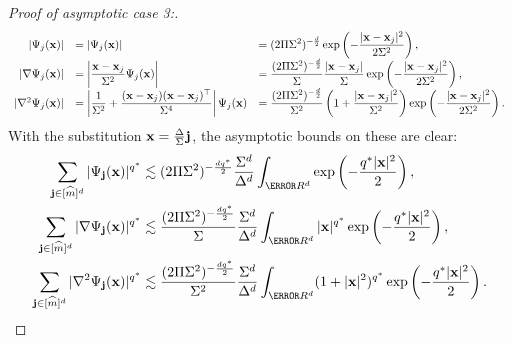 \documentclass[10pt,a4paper,onecolumn]{article} \usepackage[latin1]{inputenc}
\numberwithin{equation}{section}
\renewcommand{\vec}{\mathbf}
\newcommand{\UCmath}[1]{%
	\begingroup
	\ucmathlist\uppercase\expandafter{#1}%
	\endgroup
}
\newcommand{\ucmathlist}{%
	\def\alpha{\mathrm{A}}%
	\def\beta{\mathrm{B}}%
	\let\gamma=\Gamma
	\let\delta=\Delta
	\def\epsilon{\mathrm{E}}%
	\def\varepsilon{\mathrm{E}}%
	\def\zeta{\mathrm{Z}}%
	\def\eta{\mathrm{H}}%
	\let\theta=\Theta
	\let\vartheta=\Theta
	\def\iota{\mathrm{I}}%
	\def\kappa{\mathrm{K}}%
	\let\lambda=\Lambda
	\def\mu{\mathrm{M}}%
	\def\nu{\mathrm{N}}%
	\let\xi=\Xi
	\let\pi=\Pi
	\let\varpi=\Pi
	\def\rho{\mathrm{P}}%
	\def\varrho{\mathrm{P}}%
	\let\sigma=\Sigma
	\def\tau{\mathrm{T}}%
	\let\upsilon=\Upsilon
	\let\phi=\Phi
	\let\varphi=\Phi
	\def\chi{\mathrm{X}}%
	\let\psi=\Psi
	\let\omega=\Omega
}
\newcommand{\caps}[1]{\UCmath{#1}}
\newcommand*{\vard}[1]{%
	\IfEqCase{#1}{%
		{0}{\varphi}%
		{1}{\psi}%
	}[\varphi #1]%
}
\newcommand*{\varx}[1]{%
	\IfEqCase{#1}{%
		{0}{x}%
		{1}{y}%
		{2}{z}%
		{3}{r}%
	}[x#1]%
}
\newcommand*{\Varx}[1]{\caps{\varx{#1}}}
\newcommand*{\vvarx}[1]{\vec{\varx{#1}}}\newcommand*{\vVarx}[1]{\vec{\Varx{#1}}}
\begin{document}
\begin{proof}[Proof of asymptotic case 3:]
	$$\begin{array}{rll}
			\displaystyle |\vard1_j(\vvarx0)| &\displaystyle= \left|\vard1_j(\vvarx0)\right| &\displaystyle = (2\pi\sigma^2)^{-\frac d2}\exp\left(-\frac{|\vvarx0-\vvarx0_j|^2}{2\sigma^2}\right),
			\\\displaystyle |\nabla\vard1_j(\vvarx0)| &\displaystyle= \left|\frac{\vvarx0-\vvarx0_j}{\sigma^2}\vard1_j(\vvarx0)\right| &\displaystyle = \frac{(2\pi\sigma^2)^{-\frac d2}}{\sigma}\frac{|\vvarx0-\vvarx0_j|}{\sigma}\exp\left(-\frac{|\vvarx0-\vvarx0_j|^2}{2\sigma^2}\right),
			\\|\nabla^2\vard1_j(\vvarx0)| &\displaystyle =\left|\frac1{\sigma^2} + \frac{(\vvarx0-\vvarx0_j)(\vvarx0-\vvarx0_j)^\top }{\sigma^4}\right|\vard1_j(\vvarx0) &\displaystyle = \frac{(2\pi\sigma^2)^{-\frac d2}}{\sigma^2}\left(1+\frac{|\vvarx0-\vvarx0_j|^2}{\sigma^2}\right)\exp\left(-\frac{|\vvarx0-\vvarx0_j|^2}{2\sigma^2}\right).
	\end{array}$$
	With the substitution $\vvarx0=\frac{\Delta}{\sigma}\vec j$, the asymptotic bounds on these are clear:
	\begin{align*}
		\sum_{\vec j\in[\hat m]^d} |\vard1_{\vec j}(\vvarx0)|^{q^*} &\lesssim (2\pi\sigma^2)^{-\frac{dq^*}{2}}\frac{\sigma^d}{\Delta^d}\int_{\R^d}\exp\left(-\frac{q^*|\vvarx0|^2}{2}\right),
		\\\sum_{\vec j\in[\hat m]^d} |\nabla\vard1_{\vec j}(\vvarx0)|^{q^*} &\lesssim \frac{(2\pi\sigma^2)^{-\frac{dq^*}{2}}}{\sigma}\frac{\sigma^d}{\Delta^d}\int_{\R^d}|\vvarx0|^{q^*}\exp\left(-\frac{q^*|\vvarx0|^2}{2}\right),
		\\\sum_{\vec j\in[\hat m]^d} |\nabla^2\vard1_{\vec j}(\vvarx0)|^{q^*} &\lesssim \frac{(2\pi\sigma^2)^{-\frac{dq^*}{2}}}{\sigma^2}\frac{\sigma^d}{\Delta^d}\int_{\R^d}(1+|\vvarx0|^2)^{q^*}\exp\left(-\frac{q^*|\vvarx0|^2}{2}\right).
	\end{align*}
\end{proof}
\end{document}
